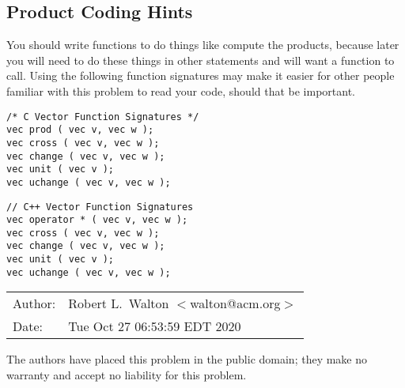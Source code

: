 \documentclass[12pt]{article}
\begin{document}
\subsection{Product Coding Hints}

You should write functions to do things like compute the products,
because later you will need to do these things in other
statements and will want a function to call.  Using the following
function signatures may make it easier
for other people familiar with this problem to read your
code, should that be important.

\hspace*{0.3in}\begin{minipage}{5.0in}
\begin{verbatim}
/* C Vector Function Signatures */
vec prod ( vec v, vec w );
vec cross ( vec v, vec w );
vec change ( vec v, vec w );
vec unit ( vec v );
vec uchange ( vec v, vec w );
\end{verbatim}
\end{minipage}

\bigskip

\hspace*{0.3in}\begin{minipage}{5.0in}
\begin{verbatim}
// C++ Vector Function Signatures
vec operator * ( vec v, vec w );
vec cross ( vec v, vec w );
vec change ( vec v, vec w );
vec unit ( vec v );
vec uchange ( vec v, vec w );
\end{verbatim}
\end{minipage}


\bigskip

\begin{tabular}{ll}
Author:	      & Robert L.~Walton $<$walton@acm.org$>$ \\
Date:         & Tue Oct 27 06:53:59 EDT 2020
\end{tabular}

The authors have placed this problem in the public domain;
they make no warranty and accept no liability for this problem.
\end{document}
